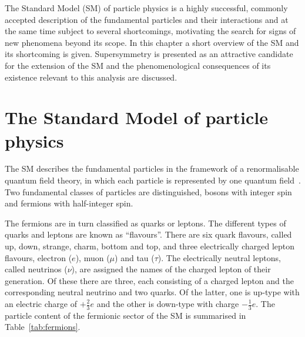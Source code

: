 The Standard Model (SM) of particle physics is a highly successful, commonly accepted description of the fundamental particles and their interactions and at the same time subject to several shortcomings, motivating the search for signs of new phenomena beyond its scope. In this chapter a short overview of the SM and its shortcoming is given. Supersymmetry is presented as an attractive candidate for the extension of the SM and the phenomenological consequences of its existence relevant to this analysis are discussed. 
\label{sec:theo}
\section{The Standard Model of particle physics}
The SM describes the fundamental particles in the framework of a renormalisable quantum field theory, in which each particle is represented by one quantum field~\cite{Glashow1961579,Salam1964168,PhysRevLett.19.1264,PhysRevD.5.1412}. Two fundamental classes of particles are distinguished, bosons with integer spin and fermions with half-integer spin. 

The fermions are in turn classified as quarks or leptons. The different types of quarks and leptons are known as ``flavours''. There are six quark flavours, called up, down, strange, charm, bottom and top, and three electrically charged lepton flavours, electron ($e$), muon ($\mu$) and tau ($\tau$). The electrically neutral leptons, called neutrinos ($\nu$), are assigned the names of the charged lepton of their generation. Of these there are three, each consisting of a charged lepton and the corresponding neutral neutrino and two quarks. Of the latter, one is up-type with an electric charge of $+\frac{2}{3}e$ and the other is down-type with charge $-\frac{1}{3}e$. The particle content of the fermionic sector of the SM is summarised in Table~\ref{tab:fermions}.

